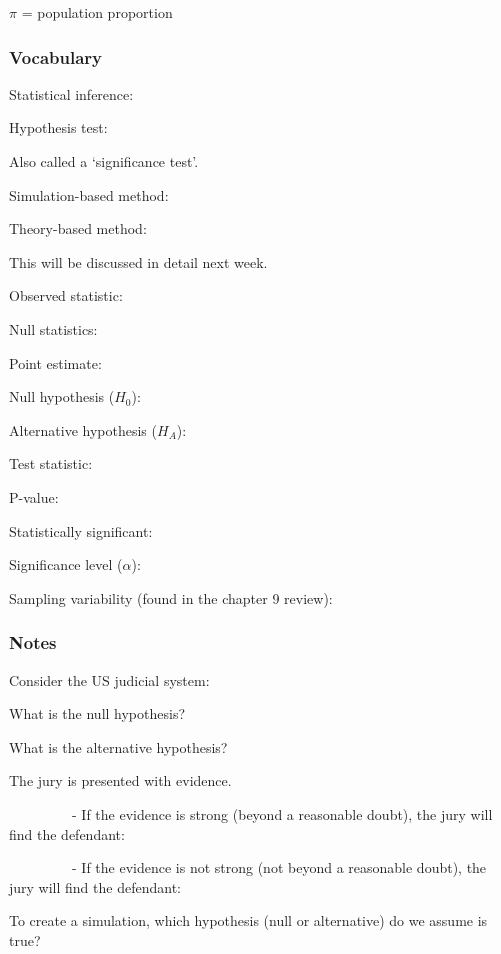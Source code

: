 \documentclass[
]{report}
\newcommand{\rgs}{\vspace{12pt}} %
\newcommand{\rgi}{\hspace{24pt}}  %
\begin{document}
\(\pi\) = population proportion

\hypertarget{vocabulary-9}{%
\subsubsection*{Vocabulary}\label{vocabulary-9}}

Statistical inference:
\rgs

Hypothesis test:

\rgi Also called a `significance test'.
\rgs

Simulation-based method:
\rgs

Theory-based method:

\rgi This will be discussed in detail next week.
\rgs

Observed statistic:
\rgs

Null statistics:
\rgs

Point estimate:
\rgs

Null hypothesis (\(H_0\)):
\rgs

Alternative hypothesis (\(H_A\)):
\rgs

Test statistic:
\rgs

P-value:
\rgs

Statistically significant:
\rgs

Significance level (\(\alpha\)):
\rgs 

Sampling variability (found in the chapter 9 review):
\rgs

\hypertarget{notes-13}{%
\subsubsection*{Notes}\label{notes-13}}

Consider the US judicial system:

\rgi What is the null hypothesis?
\rgs

\rgi What is the alternative hypothesis?
\rgs

\rgi The jury is presented with evidence.

~~~~~~~~~- If the evidence is strong (beyond a reasonable doubt), the jury will find the defendant:

\rgs

~~~~~~~~~- If the evidence is not strong (not beyond a reasonable doubt), the jury will find the defendant:

\rgs

To create a simulation, which hypothesis (null or alternative) do we assume is true?
\rgs
\end{document}
